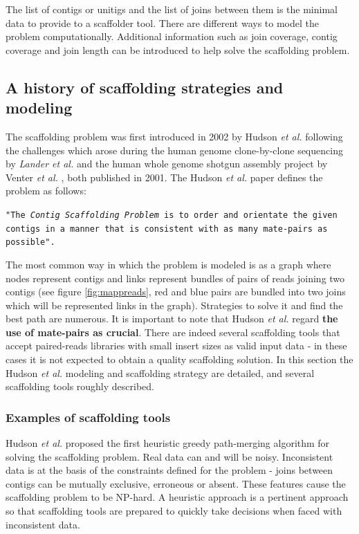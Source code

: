 \documentclass[12pt]{article}
\begin{document}
The list of contigs or unitigs and the list of joins between them is the minimal data to provide to a scaffolder tool. There are different ways to model the problem computationally. Additional information such as join coverage, contig coverage and join length can be introduced to help solve the scaffolding problem. 

\newpage
\subsection{A history of scaffolding strategies and modeling}\label{sec:hiscaf}
The scaffolding problem was first introduced in 2002 by Hudson \textit{et al.} \cite{huson_greedy_2002} following the challenges which arose during the human genome clone-by-clone sequencing by \textit{Lander et al.} \cite{lander_initial_2001} and the human whole genome shotgun  assembly project by Venter \textit{et al.} \cite{venter_sequence_2001-1}, both published in 2001. The Hudson \textit{et al.} paper defines the problem as follows: \begin{displayquote} \footnotesize \texttt{"The \textit{Contig Scaffolding Problem}  is to order and orientate the given contigs in a manner that is consistent with as many mate-pairs as possible".}\end{displayquote} The most common way in which the problem is modeled is as a graph where nodes represent contigs and links represent bundles of pairs of reads joining two contigs (see figure \ref{fig:mappreads}, red and blue pairs are bundled into two joins which will be represented links in the graph). Strategies to solve it and find the best path are numerous. It is important to note that Hudson \textit{et al.} regard \textbf{the use of mate-pairs as crucial}. There are indeed several scaffolding tools that accept paired-reads libraries with small insert sizes as valid input data - in these cases it is not expected to obtain a quality scaffolding solution. In this section the Hudson \textit{et al.} \cite{huson_greedy_2002} modeling and scaffolding strategy are detailed, and several scaffolding tools roughly described. 

\subsubsection{Examples of scaffolding tools}
Hudson \textit{et al.} proposed the first heuristic greedy path-merging algorithm for solving the scaffolding problem. Real data can and will be noisy. Inconsistent data is at the basis of the constraints defined for the problem - joins between contigs can be mutually exclusive, erroneous or absent. These features cause the scaffolding problem to be NP-hard. A heuristic approach is a pertinent approach so that scaffolding tools are prepared to quickly take decisions when faced with inconsistent data. 
\end{document}
